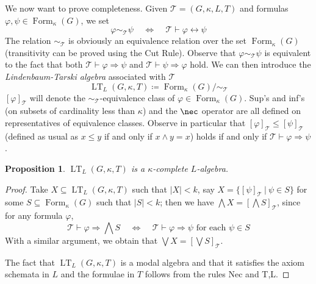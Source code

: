\documentclass{article}
\newtheorem{prop}{Proposition}
\theoremstyle{definition}
\DeclareMathOperator{\LT}{LT}
\DeclareMathOperator{\Formulas}{Form}
\newcommand{\heart}{\ensuremath\heartsuit}
\begin{document}
We now want to prove completeness. Given 
$\mathcal{T} = (G,\kappa,L,T)$
and formulas $\varphi, \psi \in \Formulas_\kappa(G)$, we set
$$\varphi \sim_\mathcal{T} \psi ~~~~~\iff~~~~~ \mathcal{T} \vdash \varphi \leftrightarrow \psi$$
The relation $\sim_\mathcal{T}$ is obviously an equivalence relation over the set $\Formulas_\kappa(G)$ (transitivity can be proved using the Cut Rule). Observe that $\varphi \sim_\mathcal{T} \psi$ is equivalent to the fact that both $\mathcal{T} \vdash \varphi \Rightarrow \psi$ and $\mathcal{T} \vdash \psi \Rightarrow \varphi$ hold. We can then introduce the \emph{Lindenbaum-Tarski algebra} associated with $\mathcal{T}$
$$\LT_L(G,\kappa,T) \coloneqq \Formulas_\kappa(G)/\sim_{\mathcal{T}}$$
$[\varphi]_\mathcal{T}$ will denote the $\sim_\mathcal{T}$-equivalence class of $\varphi \in \Formulas_\kappa(G)$. Sup's and inf's (on subsets of cardinality less than $\kappa$) and the $\nec$ operator are all defined on representatives of equivalence classes.  Observe in particular that $[\varphi]_\mathcal{T} \leq [\psi]_\mathcal{T}$ (defined  as usual as $x \leq y$ if and only if $x \wedge y = x$)
holds if and only if $\mathcal{T} \vdash \varphi \Rightarrow \psi$.
\begin{prop}\label{prop:kcompl}
$\LT_L(G,\kappa,T)$ is a $\kappa$-complete $L$-algebra.
\end{prop}
\begin{proof}
%
%


Take $X \subseteq \LT_L(G,\kappa,T)$ such that $|X|<k$, say $X = \{[\psi]_\mathcal{T}\ \vert\ \psi \in S\}$ for some $S \subseteq \Formulas_\kappa(G)$ such that $|S|<k$; then 
we have $\bigwedge X = [\bigwedge S]_\mathcal{T}$, since
for any formula $\varphi$,
$$\mathcal{T} \vdash \varphi \Rightarrow \bigwedge S ~~~~~\iff~~~~~ \mathcal{T} \vdash \varphi \Rightarrow \psi \text{ for each } \psi \in S$$
With a similar argument, we obtain that $\bigvee X = [\bigvee S]_\mathcal{T}$.

The fact that $\LT_L(G,\kappa,T)$ is a modal algebra and that it satisfies the axiom schemata in $L$ and the formulae in $T$ follows from the rules Nec and T,L.
\end{proof}
\end{document}
